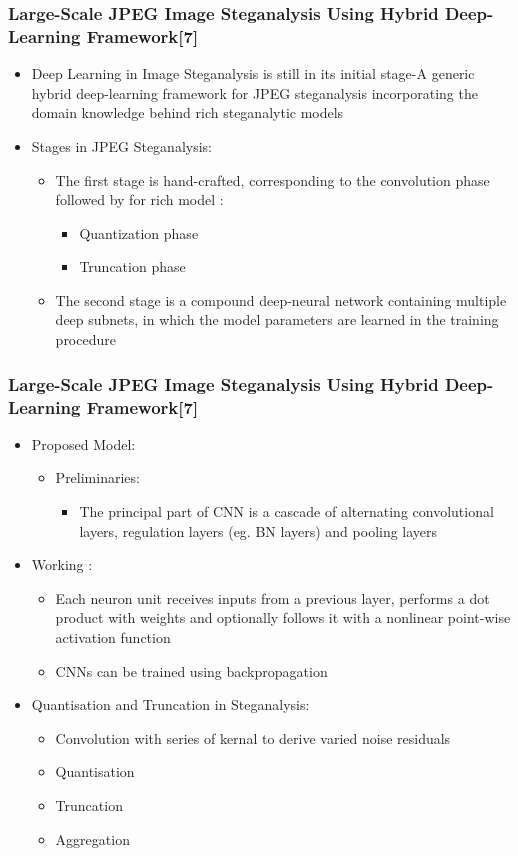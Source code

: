 \documentclass{beamer} %
\theoremstyle{definition} %
\begin{document}
\begin{frame}
\frametitle{Large-Scale JPEG Image Steganalysis Using Hybrid Deep-Learning Framework[7]  }
\begin{itemize}
	\item Deep Learning in Image Steganalysis is still in its initial stage-A generic hybrid deep-learning framework for JPEG steganalysis incorporating the domain knowledge behind rich steganalytic models
	\item Stages in JPEG Steganalysis:
	\begin{itemize}
		\item The first stage is hand-crafted, corresponding to the convolution phase followed by for rich model : 
		\begin{itemize}
            \item 	Quantization phase  
            \item   Truncation phase 
		\end{itemize}
	    \item The second stage is a compound deep-neural network containing multiple deep subnets, in which the model parameters are learned in
		the training procedure  
	\end{itemize}
\end{itemize}
\end{frame}
\begin{frame}
\frametitle{Large-Scale JPEG Image Steganalysis Using Hybrid Deep-Learning Framework[7]  }
\begin{itemize}
		\item Proposed Model:
	\begin{itemize}
		\item{Preliminaries: }
		\begin{itemize}
			\item 	The principal part of CNN is a cascade of alternating convolutional layers, regulation layers (eg. BN layers) and pooling layers  
		\end{itemize}
\end{itemize}
\item Working : 
\begin{itemize}
	\item Each neuron unit receives inputs from a previous layer, performs a dot product with weights and optionally follows it with a nonlinear point-wise activation function 
	\item CNNs can be trained using backpropagation 
\end{itemize}
\item Quantisation and Truncation in Steganalysis:
\begin{itemize}
	\item Convolution with series of kernal to derive varied noise residuals 
	\item Quantisation  
	\item Truncation 
	\item Aggregation  
\end{itemize}
\end{itemize}
\end{frame}
\end{document}
